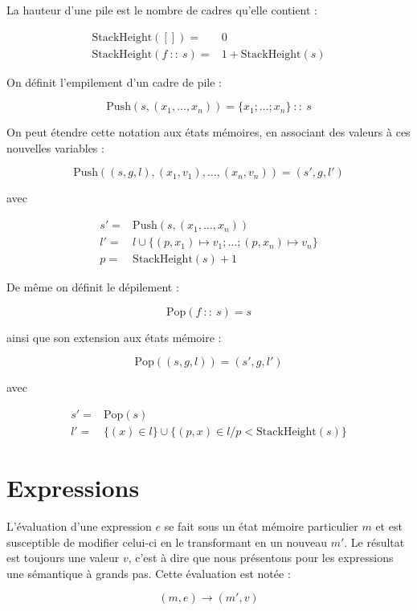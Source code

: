 \begin{definition}

  La hauteur d'une pile est le nombre de cadres qu'elle contient :

  \begin{align*}
    \mathrm{StackHeight}([])     = & 0 \\
    \mathrm{StackHeight}(f~::~s) = & 1 + \mathrm{StackHeight}(s)
  \end{align*}

  On définit l'empilement d'un cadre de pile :

  \[
    \mathrm{Push}(s, (x_1, …, x_n)) = \{ x_1 ; … ; x_n \}~::~s
  \]

  On peut étendre cette notation aux états mémoires, en associant des valeurs à
  ces nouvelles variables :

  \[
    \mathrm{Push}((s, g, l), (x_1, v_1), …, (x_n, v_n)) = (s', g, l')
  \]

  avec

  \begin{align*}
    s' = & \mathrm{Push}(s, (x_1, …, x_n)) \\
    l' = & l \cup \{(p, x_1) ↦ v_1; … ; (p, x_n) ↦ v_n\} \\
    p  = & \mathrm{StackHeight}(s) + 1
  \end{align*}

  De même on définit le dépilement :

  \[
    \mathrm{Pop}(f~::~s) = s
  \]

  ainsi que son extension aux états mémoire :

  \[
    \mathrm{Pop}((s, g, l)) = (s', g, l')
  \]

  avec

  \begin{align*}
    s' = & \mathrm{Pop}(s) \\
    l' = & \{ (x) ∈ l \} \cup \{ (p, x) ∈ l / p < \mathrm{StackHeight}(s) \}
  \end{align*}

\end{definition}

\section{Expressions}

\begin{definition}

  L'évaluation d'une expression $e$ se fait sous un état mémoire particulier $m$
  et est susceptible de modifier celui-ci en le transformant en un nouveau $m'$.
  Le résultat est toujours une valeur $v$, c'est à dire que nous présentons pour
  les expressions une sémantique à grands pas. Cette évaluation est notée :

  \[
    (m, e) → (m', v)
  \]

\end{definition}

